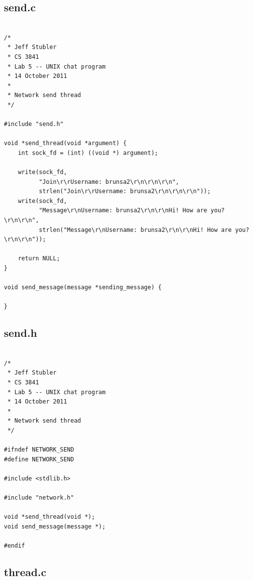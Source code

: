 \documentclass{article}
\begin{document}
\subsection*{send.c}

\begin{verbatim}

/*
 * Jeff Stubler
 * CS 3841
 * Lab 5 -- UNIX chat program
 * 14 October 2011
 *
 * Network send thread
 */

#include "send.h"

void *send_thread(void *argument) {
    int sock_fd = (int) ((void *) argument);
    
    write(sock_fd,
          "Join\r\rUsername: brunsa2\r\n\r\n\r\n",
          strlen("Join\r\rUsername: brunsa2\r\n\r\n\r\n"));
    write(sock_fd,
          "Message\r\nUsername: brunsa2\r\n\r\nHi! How are you?\r\n\r\n",
          strlen("Message\r\nUsername: brunsa2\r\n\r\nHi! How are you?\r\n\r\n"));
    
    return NULL;
}

void send_message(message *sending_message) {
    
}

\end{verbatim}

\subsection*{send.h}

\begin{verbatim}

/*
 * Jeff Stubler
 * CS 3841
 * Lab 5 -- UNIX chat program
 * 14 October 2011
 *
 * Network send thread
 */

#ifndef NETWORK_SEND
#define NETWORK_SEND

#include <stdlib.h>

#include "network.h"

void *send_thread(void *);
void send_message(message *);

#endif

\end{verbatim}

\subsection*{thread.c}
\end{document}
